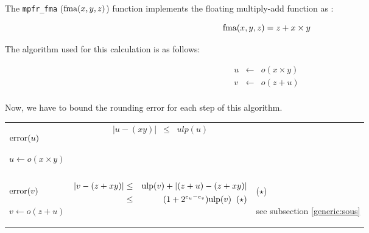 \documentclass[12pt]{amsart}
\def\n{\textnormal}
\def\ulp{{\rm ulp}}
\begin{document}
The {\tt mpfr\_fma} ($\n{fma}(x,y,z)$) function implements the floating multiply-add function  as :

\[
\textnormal{fma} (x,y,z) = z + x \times y
\]

The algorithm used for this calculation is as follows:

\begin{eqnarray}\nonumber
u&\leftarrow&o(x \times y)\\\nonumber
v&\leftarrow&o(z + u)\\\nonumber
\end{eqnarray}

Now, we have to bound the rounding error for each step of this
algorithm.  



\begin{center}
\begin{tabular}{l l l}

\begin{minipage}{2.5cm}


${\textnormal{error}}(u)$


$u \leftarrow o(x \times y)$

\end{minipage} &
\begin{minipage}{7.5cm}

\begin{eqnarray}\nonumber
  |u-(xy)| &\leq& ulp(u)\\\nonumber
\end{eqnarray}

\end{minipage} &
\begin{minipage}{6cm}
{\hspace{7cm}}
\end{minipage}\\%
\begin{minipage}{2.5cm}
${\textnormal{error}}(v)$


$v \leftarrow o(z+u) $

\end{minipage} &
\begin{minipage}{7.5cm}

\begin{eqnarray}\nonumber
  |v-(z+xy)| &\leq& \ulp(v) + |(z+u) - (z+xy)|\\\nonumber
&\leq& (1+2^{e_u-e_v})\ulp(v)\;\;(\star)\\\nonumber
\end{eqnarray}


\end{minipage} &
\begin{minipage}{6cm}
($\star$)

see subsection \ref{generic:sous}


\end{minipage}
\end{tabular}
\end{center}
\end{document}
